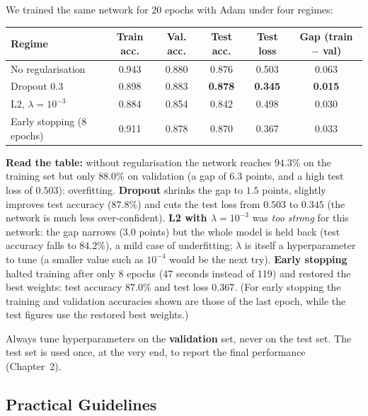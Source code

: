 We trained the same network for 20 epochs with Adam under four regimes:

\begin{center}
\begin{tabular}{@{}p{4.3cm}ccccc@{}}
\toprule
\textbf{Regime} & \textbf{Train acc.} & \textbf{Val. acc.} & \textbf{Test acc.} & \textbf{Test loss} & \textbf{Gap (train $-$ val)}\\
\midrule
No regularisation & 0.943 & 0.880 & 0.876 & 0.503 & 0.063\\
Dropout $0.3$ & 0.898 & 0.883 & \textbf{0.878} & \textbf{0.345} & \textbf{0.015}\\
L2, $\lambda=10^{-3}$ & 0.884 & 0.854 & 0.842 & 0.498 & 0.030\\
Early stopping (8 epochs) & 0.911 & 0.878 & 0.870 & 0.367 & 0.033\\
\bottomrule
\end{tabular}
\end{center}

\noindent \textbf{Read the table:} without regularisation the network reaches $94.3\%$ on the training set but only $88.0\%$ on validation (a gap of $6.3$ points, and a high test loss of $0.503$): overfitting. \textbf{Dropout} shrinks the gap to $1.5$ points, slightly improves test accuracy ($87.8\%$) and cuts the test loss from $0.503$ to $0.345$ (the network is much less over-confident). \textbf{L2 with $\lambda=10^{-3}$} was \emph{too strong} for this network: the gap narrows ($3.0$ points) but the whole model is held back (test accuracy falls to $84.2\%$), a mild case of underfitting; $\lambda$ is itself a hyperparameter to tune (a smaller value such as $10^{-4}$ would be the next try). \textbf{Early stopping} halted training after only 8 epochs (47 seconds instead of 119) and restored the best weights: test accuracy $87.0\%$ and test loss $0.367$. (For early stopping the training and validation accuracies shown are those of the last epoch, while the test figures use the restored best weights.)

\begin{warning}
Always tune hyperparameters on the \textbf{validation} set, never on the test set. The test set is used once, at the very end, to report the final performance (Chapter~2).
\end{warning}

\subsection{Practical Guidelines}

